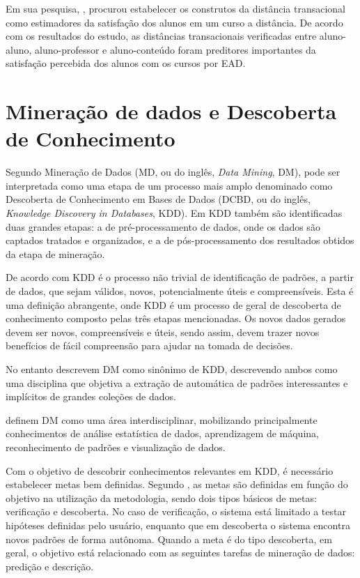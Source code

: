 Em sua pesquisa, , procurou estabelecer os
construtos da distância transacional como estimadores da satisfação dos alunos
em um curso a distância. De acordo com os resultados do estudo, as distâncias
transacionais verificadas entre aluno-aluno, aluno-professor e aluno-conteúdo
foram preditores importantes da satisfação percebida dos alunos com os cursos
por EAD.

\section{Mineração de dados e Descoberta de Conhecimento}

Segundo  Mineração de Dados (MD, ou do inglês,
\textit{Data Mining}, DM), pode ser interpretada como uma etapa de um processo
mais amplo denominado como Descoberta de Conhecimento em Bases de Dados (DCBD,
ou do inglês, \textit{Knowledge Discovery in Databases}, KDD). Em KDD também são
identificadas duas grandes etapas: a de pré-processamento de dados, onde os
dados são captados tratados e organizados, e a de pós-processamento dos
resultados obtidos da etapa de mineração.

De acordo com  KDD é o processo não trivial de
identificação de padrões, a partir de dados, que sejam válidos, novos,
potencialmente úteis e compreensíveis. Esta é uma definição abrangente, onde KDD
é um processo de geral de descoberta de conhecimento composto pelas três etapas
mencionadas. Os novos dados gerados devem ser novos, compreensíveis e úteis,
sendo assim, devem trazer novos benefícios de fácil compreensão para ajudar na
tomada de decisões.

No entanto  descrevem DM como sinônimo de KDD,
descrevendo ambos como uma disciplina que objetiva a extração de automática de
padrões interessantes e implícitos de grandes coleções de dados.

 definem DM como uma área interdisciplinar,
mobilizando principalmente conhecimentos de análise estatística de dados,
aprendizagem de máquina, reconhecimento de padrões e visualização de dados.

Com o objetivo de descobrir conhecimentos relevantes em KDD, é necessário
estabelecer metas bem definidas. Segundo , as metas
são definidas em função do objetivo na utilização da metodologia, sendo dois
tipos básicos de metas: verificação e descoberta. No caso de verificação, o
sistema está limitado a testar hipóteses definidas pelo usuário, enquanto que em
descoberta o sistema encontra novos padrões de forma autônoma. Quando a meta é
do tipo descoberta, em geral, o objetivo está relacionado com as seguintes
tarefas de mineração de dados: predição e descrição.

